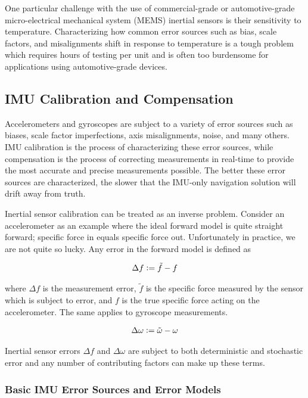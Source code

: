 One particular challenge with the use of commercial-grade or automotive-grade micro-electrical mechanical system (MEMS) inertial sensors is their sensitivity to temperature. Characterizing how common error sources such as bias, scale factors, and misalignments shift in response to temperature is a tough problem which requires hours of testing per unit and is often too burdensome for applications using automotive-grade devices. 

\subsection{IMU Calibration and Compensation}

Accelerometers and gyroscopes are subject to a variety of error sources such as biases, scale factor imperfections, axis misalignments, noise, and many others. IMU calibration is the process of characterizing these error sources, while compensation is the process of correcting measurements in real-time to provide the most accurate and precise measurements possible. The better these error sources are characterized, the slower that the IMU-only navigation solution will drift away from truth. 

Inertial sensor calibration can be treated as an inverse problem. Consider an accelerometer as an example where the ideal forward model is quite straight forward; specific force in equals specific force out. Unfortunately in practice, we are not quite so lucky. Any error in the forward model is defined as

\begin{align*}
	\Delta f \vcentcolon= \tilde{f} - f
\end{align*}

where $\Delta f$ is the measurement error, $\tilde{f}$ is the specific force measured by the sensor which is subject to error, and $f$ is the true specific force acting on the accelerometer. The same applies to gyroscope measurements. 

\begin{align*}
	\Delta \omega \vcentcolon= \tilde{\omega} - \omega
\end{align*}

Inertial sensor errors $\Delta f$ and $\Delta \omega$ are subject to both deterministic and stochastic error and any number of contributing factors can make up these terms.

\subsubsection{Basic IMU Error Sources and Error Models}

